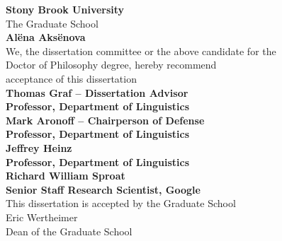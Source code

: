 \begin{center}
\textbf{Stony Brook University} \\ \vspace{2em}
The Graduate School \\ \vspace{2.3em}
\textbf{Al\"ena Aks\"enova} \\ \vspace{2.3em}
We, the dissertation committee or the above candidate for the \\
Doctor of Philosophy degree, hereby recommend \\
acceptance of this dissertation \\ \vspace{2.3em}
\textbf{Thomas Graf -- Dissertation Advisor} \\
\textbf{Professor, Department of Linguistics}  \\ \vspace{2.3em}
\textbf{Mark Aronoff -- Chairperson of Defense} \\
\textbf{Professor, Department of Linguistics}  \\ \vspace{2.3em}
\textbf{Jeffrey Heinz} \\
\textbf{Professor, Department of Linguistics}  \\ \vspace{2.3em}
\textbf{Richard William Sproat} \\
\textbf{Senior Staff Research Scientist, Google}  \\ \vspace{2.3em}
This dissertation is accepted by the Graduate School \\ \vspace{2.3em}
Eric Wertheimer \\
Dean of the Graduate School
\end{center}
